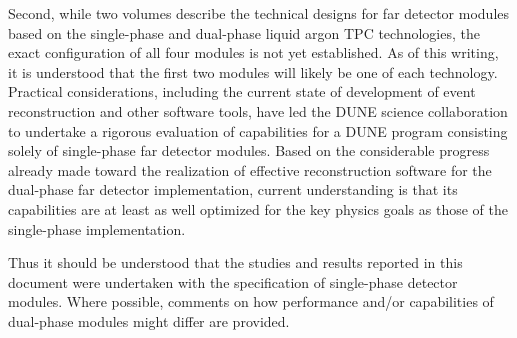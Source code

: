 Second, while two volumes describe the technical designs
for far detector modules based on the single-phase and
dual-phase liquid argon TPC technologies, the exact
configuration of all four modules is not yet established.  As of this writing,
it is understood that the first two modules will likely
be one of each technology.  Practical considerations,
including the current state of development of event
reconstruction and other software tools, have
led the DUNE science collaboration to undertake a rigorous
evaluation of capabilities for a DUNE program consisting
solely of single-phase far detector modules.  Based
on the considerable progress already made toward the
realization of effective reconstruction software for the
dual-phase far detector implementation, current
understanding is that its capabilities are at least
as well optimized for the key physics goals as those of
the single-phase implementation.

Thus it should be understood that the studies and results
reported in this document were undertaken with the
specification of single-phase detector modules.  Where possible,
comments on how performance and/or capabilities of
dual-phase modules might differ are provided.





